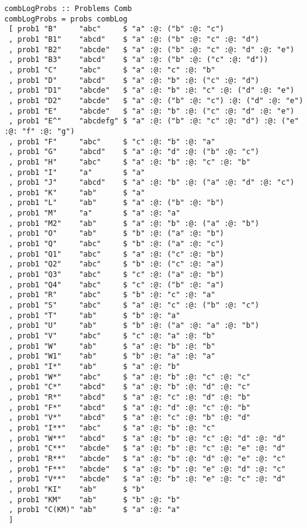 \documentclass{article}
\begin{document}
\begin{lstlisting}
combLogProbs :: Problems Comb
combLogProbs = probs combLog
 [ prob1 "B"     "abc"     $ "a" :@: ("b" :@: "c")
 , prob1 "B1"    "abcd"    $ "a" :@: ("b" :@: "c" :@: "d")
 , prob1 "B2"    "abcde"   $ "a" :@: ("b" :@: "c" :@: "d" :@: "e")
 , prob1 "B3"    "abcd"    $ "a" :@: ("b" :@: ("c" :@: "d"))
 , prob1 "C"     "abc"     $ "a" :@: "c" :@: "b"
 , prob1 "D"     "abcd"    $ "a" :@: "b" :@: ("c" :@: "d")
 , prob1 "D1"    "abcde"   $ "a" :@: "b" :@: "c" :@: ("d" :@: "e")
 , prob1 "D2"    "abcde"   $ "a" :@: ("b" :@: "c") :@: ("d" :@: "e")
 , prob1 "E"     "abcde"   $ "a" :@: "b" :@: ("c" :@: "d" :@: "e")
 , prob1 "E^"    "abcdefg" $ "a" :@: ("b" :@: "c" :@: "d") :@: ("e" :@: "f" :@: "g")
 , prob1 "F"     "abc"     $ "c" :@: "b" :@: "a"
 , prob1 "G"     "abcd"    $ "a" :@: "d" :@: ("b" :@: "c")
 , prob1 "H"     "abc"     $ "a" :@: "b" :@: "c" :@: "b"
 , prob1 "I"     "a"       $ "a"
 , prob1 "J"     "abcd"    $ "a" :@: "b" :@: ("a" :@: "d" :@: "c")
 , prob1 "K"     "ab"      $ "a"
 , prob1 "L"     "ab"      $ "a" :@: ("b" :@: "b")
 , prob1 "M"     "a"       $ "a" :@: "a"
 , prob1 "M2"    "ab"      $ "a" :@: "b" :@: ("a" :@: "b")
 , prob1 "O"     "ab"      $ "b" :@: ("a" :@: "b")
 , prob1 "Q"     "abc"     $ "b" :@: ("a" :@: "c")
 , prob1 "Q1"    "abc"     $ "a" :@: ("c" :@: "b")
 , prob1 "Q2"    "abc"     $ "b" :@: ("c" :@: "a")
 , prob1 "Q3"    "abc"     $ "c" :@: ("a" :@: "b")
 , prob1 "Q4"    "abc"     $ "c" :@: ("b" :@: "a")
 , prob1 "R"     "abc"     $ "b" :@: "c" :@: "a"
 , prob1 "S"     "abc"     $ "a" :@: "c" :@: ("b" :@: "c")
 , prob1 "T"     "ab"      $ "b" :@: "a"
 , prob1 "U"     "ab"      $ "b" :@: ("a" :@: "a" :@: "b")
 , prob1 "V"     "abc"     $ "c" :@: "a" :@: "b"
 , prob1 "W"     "ab"      $ "a" :@: "b" :@: "b"
 , prob1 "W1"    "ab"      $ "b" :@: "a" :@: "a"
 , prob1 "I*"    "ab"      $ "a" :@: "b"
 , prob1 "W*"    "abc"     $ "a" :@: "b" :@: "c" :@: "c"
 , prob1 "C*"    "abcd"    $ "a" :@: "b" :@: "d" :@: "c"
 , prob1 "R*"    "abcd"    $ "a" :@: "c" :@: "d" :@: "b"
 , prob1 "F*"    "abcd"    $ "a" :@: "d" :@: "c" :@: "b"
 , prob1 "V*"    "abcd"    $ "a" :@: "c" :@: "b" :@: "d"
 , prob1 "I**"   "abc"     $ "a" :@: "b" :@: "c"
 , prob1 "W**"   "abcd"    $ "a" :@: "b" :@: "c" :@: "d" :@: "d"
 , prob1 "C**"   "abcde"   $ "a" :@: "b" :@: "c" :@: "e" :@: "d"
 , prob1 "R**"   "abcde"   $ "a" :@: "b" :@: "d" :@: "e" :@: "c"
 , prob1 "F**"   "abcde"   $ "a" :@: "b" :@: "e" :@: "d" :@: "c"
 , prob1 "V**"   "abcde"   $ "a" :@: "b" :@: "e" :@: "c" :@: "d"
 , prob1 "KI"    "ab"      $ "b"
 , prob1 "KM"    "ab"      $ "b" :@: "b"
 , prob1 "C(KM)" "ab"      $ "a" :@: "a"
 ]


\end{lstlisting}
\end{document}
